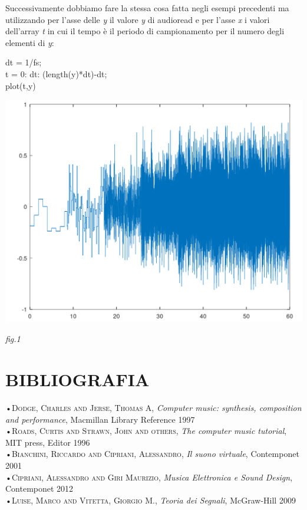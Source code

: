 \documentclass[11pt]{article}
\begin{document}
\begin{multicols*}{2}
\noindent Successivamente dobbiamo fare la stessa cosa fatta negli esempi precedenti ma utilizzando per l’asse delle \textit y il valore \textit y di audioread e per l’asse \textit x i valori dell’array \textit t in cui il tempo è il periodo di campionamento per il numero degli elementi di \textit y:

\vspace{0.3cm}

\begin{center}
\begin{minipage}[c]{6cm}
\begin{sffamily}

dt = 1/fs; \\
t = 0: dt: (length(y)*dt)-dt;\\
plot(t,y)\\

\end{sffamily}
\end{minipage}
\end{center}

\begin{center}
\includegraphics[scale=0.2]{images/plot05.png}

{\scriptsize \emph{fig.1 }}
\end{center}


\section*{\centering\small{BIBLIOGRAFIA}}
•\textsc{\textsf {Dodge, Charles and Jerse, Thomas A}}, \emph{Computer music: synthesis, composition and performance}, Macmillan Library Reference 1997\\
•\textsc{\textsf {Roads, Curtis and Strawn, John and others}}, \emph{The computer music tutorial}, MIT press, Editor 1996\\
•\textsc{\textsf {Bianchini, Riccardo and Cipriani, Alessandro}}, \emph{Il suono virtuale}, Contemponet 2001\\
•\textsc{\textsf {Cipriani, Alessandro and Giri Maurizio}}, \emph{Musica Elettronica e Sound Design}, Contemponet 2012\\
•\textsc{\textsf {Luise, Marco and Vitetta, Giorgio M.}}, \emph{Teoria dei Segnali}, McGraw-Hill 2009\\

\end{multicols*}
\end{document}
